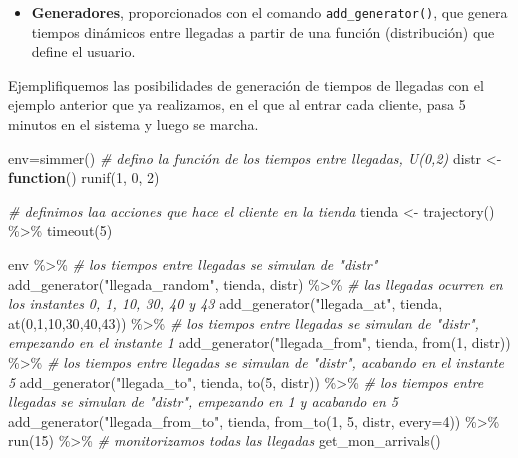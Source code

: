 \documentclass[
]{book}
\newenvironment{Shaded}{\begin{snugshade}}{\end{snugshade}}
\newcommand{\AttributeTok}[1]{\textcolor[rgb]{0.77,0.63,0.00}{#1}}
\newcommand{\CommentTok}[1]{\textcolor[rgb]{0.56,0.35,0.01}{\textit{#1}}}
\newcommand{\ControlFlowTok}[1]{\textcolor[rgb]{0.13,0.29,0.53}{\textbf{#1}}}
\newcommand{\DecValTok}[1]{\textcolor[rgb]{0.00,0.00,0.81}{#1}}
\newcommand{\FunctionTok}[1]{\textcolor[rgb]{0.00,0.00,0.00}{#1}}
\newcommand{\NormalTok}[1]{#1}
\newcommand{\OtherTok}[1]{\textcolor[rgb]{0.56,0.35,0.01}{#1}}
\newcommand{\SpecialCharTok}[1]{\textcolor[rgb]{0.00,0.00,0.00}{#1}}
\newcommand{\StringTok}[1]{\textcolor[rgb]{0.31,0.60,0.02}{#1}}
\providecommand{\tightlist}{%
  \setlength{\itemsep}{0pt}\setlength{\parskip}{0pt}}
\theoremstyle{definition}
\theoremstyle{definition}
\theoremstyle{definition}
\theoremstyle{definition}
\theoremstyle{remark}
\begin{document}
\begin{itemize}
\tightlist
\item
  \textbf{Generadores}, proporcionados con el comando \texttt{add\_generator()}, que genera tiempos dinámicos entre llegadas a partir de una función (distribución) que define el usuario.
\end{itemize}

Ejemplifiquemos las posibilidades de generación de tiempos de llegadas con el ejemplo anterior que ya realizamos, en el que al entrar cada cliente, pasa 5 minutos en el sistema y luego se marcha.

\begin{Shaded}
\begin{Highlighting}[]
\NormalTok{env}\OtherTok{=}\FunctionTok{simmer}\NormalTok{()}
\CommentTok{\# defino la función de los tiempos entre llegadas, U(0,2)}
\NormalTok{distr }\OtherTok{\textless{}{-}} \ControlFlowTok{function}\NormalTok{() }\FunctionTok{runif}\NormalTok{(}\DecValTok{1}\NormalTok{, }\DecValTok{0}\NormalTok{, }\DecValTok{2}\NormalTok{)}

\CommentTok{\# definimos laa acciones que hace el cliente en la tienda}
\NormalTok{tienda }\OtherTok{\textless{}{-}} \FunctionTok{trajectory}\NormalTok{() }\SpecialCharTok{\%\textgreater{}\%}
  \FunctionTok{timeout}\NormalTok{(}\DecValTok{5}\NormalTok{)}

\NormalTok{env }\SpecialCharTok{\%\textgreater{}\%}
  \CommentTok{\# los tiempos entre llegadas se simulan de "distr"}
  \FunctionTok{add\_generator}\NormalTok{(}\StringTok{"llegada\_random"}\NormalTok{, tienda, distr) }\SpecialCharTok{\%\textgreater{}\%}
  \CommentTok{\# las llegadas ocurren en los instantes 0, 1, 10, 30, 40 y 43}
  \FunctionTok{add\_generator}\NormalTok{(}\StringTok{"llegada\_at"}\NormalTok{, tienda, }\FunctionTok{at}\NormalTok{(}\DecValTok{0}\NormalTok{,}\DecValTok{1}\NormalTok{,}\DecValTok{10}\NormalTok{,}\DecValTok{30}\NormalTok{,}\DecValTok{40}\NormalTok{,}\DecValTok{43}\NormalTok{)) }\SpecialCharTok{\%\textgreater{}\%}
  \CommentTok{\# los tiempos entre llegadas se simulan de "distr", empezando en el instante 1}
  \FunctionTok{add\_generator}\NormalTok{(}\StringTok{"llegada\_from"}\NormalTok{, tienda, }\FunctionTok{from}\NormalTok{(}\DecValTok{1}\NormalTok{, distr)) }\SpecialCharTok{\%\textgreater{}\%}
  \CommentTok{\# los tiempos entre llegadas se simulan de "distr", acabando en el instante 5}
  \FunctionTok{add\_generator}\NormalTok{(}\StringTok{"llegada\_to"}\NormalTok{, tienda, }\FunctionTok{to}\NormalTok{(}\DecValTok{5}\NormalTok{, distr)) }\SpecialCharTok{\%\textgreater{}\%}
  \CommentTok{\# los tiempos entre llegadas se simulan de "distr", empezando en 1 y acabando en 5}
  \FunctionTok{add\_generator}\NormalTok{(}\StringTok{"llegada\_from\_to"}\NormalTok{, tienda, }\FunctionTok{from\_to}\NormalTok{(}\DecValTok{1}\NormalTok{, }\DecValTok{5}\NormalTok{, distr, }\AttributeTok{every=}\DecValTok{4}\NormalTok{)) }\SpecialCharTok{\%\textgreater{}\%}
  \FunctionTok{run}\NormalTok{(}\DecValTok{15}\NormalTok{) }\SpecialCharTok{\%\textgreater{}\%} 
  \CommentTok{\# monitorizamos todas las llegadas}
  \FunctionTok{get\_mon\_arrivals}\NormalTok{()}
\end{Highlighting}
\end{Shaded}
\end{document}
